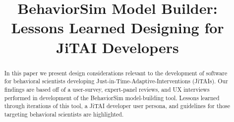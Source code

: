 \documentclass{sigchi}
\begin{document}
\title{BehaviorSim Model Builder: Lessons Learned Designing for JiTAI Developers}

\author{%
  \alignauthor{Tylar Murray \\
    \affaddr{University of South Florida}\\%
    \affaddr{Tampa, USA}\\
    \email{tylarmurray@mail.usf.edu}\\
    }
  \alignauthor{Eric Hekler\\
    \affaddr{Arizona State University}\\%
    \affaddr{Phoenix, USA}\\
    }
  \alignauthor{Donna Spruijt-Metz \\
    \affaddr{University of Southern California}\\%
    \affaddr{ Los Angeles, USA}\\
    }
  \alignauthor{Daniel E. Rivera \\
    \affaddr{Arizona State University}\\%
    \affaddr{Tempe, USA}\\
    }
  \alignauthor{Andrew Raij \\
    \affaddr{University of Central Florida}\\%
    \affaddr{Orlando, USA}\\
    }
}


\maketitle

\begin{abstract}
In this paper we present design considerations relevant to the development of software for behavioral scientists developing Just-in-Time-Adaptive-Interventions (JiTAIs). 
Our findings are based off of a user-survey, expert-panel reviews, and UX interviews performed in development of the BehaviorSim model-building tool. 
Lessons learned through iterations of this tool, a JiTAI developer user persona, and guidelines for those targeting behavioral scientists are highlighted. 
\end{abstract}
\end{document}
